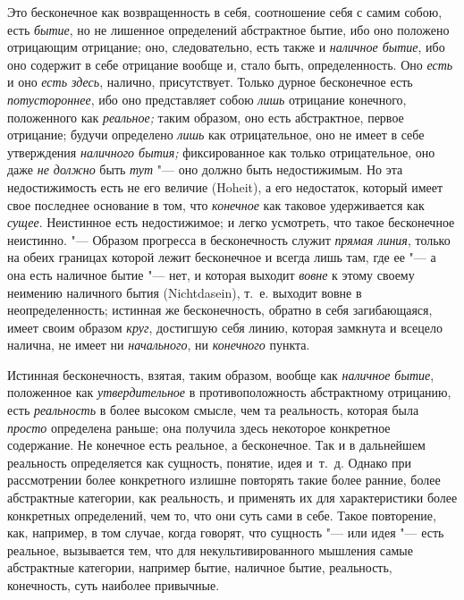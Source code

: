 Это бесконечное как возвращенность в себя, соотношение себя с самим собою,
есть {\em бытие}, но не лишенное определений
абстрактное бытие, ибо оно положено отрицающим отрицание; оно,
следовательно, есть также и {\em наличное бытие}, ибо
оно содержит в себе отрицание вообще и, стало быть, определенность. Оно
{\em есть} и оно {\em есть здесь},
налично, присутствует. Только дурное бесконечное есть
{\em потустороннее}, ибо оно представляет собою
{\em лишь} отрицание конечного, положенного как
{\em реальное;} таким образом, оно есть абстрактное,
первое отрицание; будучи определено {\em лишь} как
отрицательное, оно не имеет в себе утверждения
{\em наличного бытия;} фиксированное как только
отрицательное, оно даже {\em не должно} быть
{\em тут} "--- оно должно быть недостижимым. Но эта
недостижимость есть не его величие (Hoheit), а его недостаток, который
имеет свое последнее основание в том, что
{\em конечное} как таковое удерживается как
{\em сущее}. Неистинное есть недостижимое; и легко
усмотреть, что такое бесконечное неистинно. "--- Образом прогресса в
бесконечность служит {\em прямая линия}, только на
обеих границах которой лежит бесконечное и всегда лишь там, где ее "--- а она
есть наличное бытие "--- нет, и которая выходит
{\em вовне} к этому своему неимению наличного бытия
(Nicht\-dasein), т.~е. выходит вовне в неопределенность; истинная же
бесконечность, обратно в себя загибающаяся, имеет своим образом
{\em круг}, достигшую себя линию, которая замкнута и
всецело налична, не имеет ни {\em начального}, ни {\em конечного} пункта.

Истинная бесконечность, взятая, таким образом, вообще как
{\em наличное бытие}, положенное как
{\em утвердительное} в противоположность абстрактному
отрицанию, есть {\em реальность} в более высоком
смысле, чем та реальность, которая была {\em просто}
определена раньше; она получила здесь некоторое конкретное содержание. Не
конечное есть реальное, а бесконечное. Так и в дальнейшем реальность
определяется как сущность, понятие, идея и~т.~д. Однако при рассмотрении
более конкретного излишне повторять такие более ранние, более абстрактные
категории, как реальность, и применять их для характеристики более
конкретных определений, чем то, что они суть сами в себе. Такое повторение,
как, например, в том случае, когда говорят,
что сущность "--- или идея "--- есть
реальное, вызывается тем, что для некультивированного мышления самые
абстрактные категории, например бытие, наличное бытие, реальность,
конечность, суть наиболее привычные.

